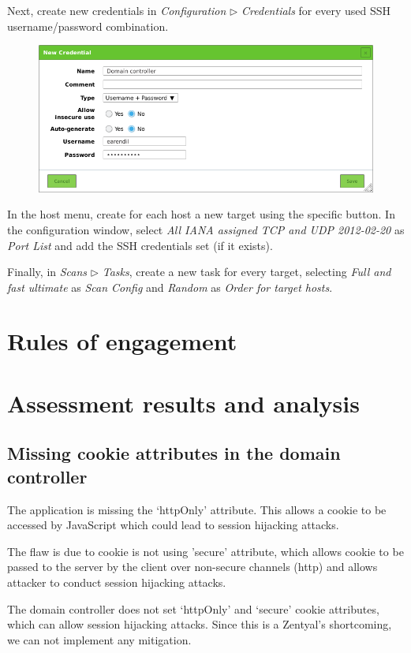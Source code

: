 \documentclass[draft]{homework}
\begin{document}
    Next, create new credentials in \textit{Configuration} $\triangleright$ \textit{Credentials} for every used SSH username/password combination.
    \vspace{-5pt}
    \begin{figure}[H]
        \centering
        \includegraphics[width=1\linewidth]{images/new-credentials}
        \label{fig:new-credentials}
    \end{figure}
    \vspace{-20pt}
    
    In the host menu, create for each host a new target using the specific button.
    In the configuration window, select \textit{All IANA assigned TCP and UDP 2012-02-20} as \textit{Port List} and add the SSH credentials set (if it exists).
    
    Finally, in \textit{Scans} $\triangleright$ \textit{Tasks}, create a new task for every target, selecting \textit{Full and fast ultimate} as \textit{Scan Config} and \textit{Random} as \textit{Order for target hosts}.
    
    
    \section{Rules of engagement}
    
    
    \section{Assessment results and analysis}
    \subsection{Missing cookie attributes in the domain controller}
    \begin{displayquote}
        The application is missing the `httpOnly' attribute.
        \textelp{}
        This allows a cookie to be accessed by JavaScript which could lead to session hijacking attacks.
    \end{displayquote}
    \begin{displayquote}
        The flaw is due to cookie is not using 'secure' attribute, which allows cookie to be passed to the server by the client over non-secure channels (http) and allows attacker to conduct session hijacking attacks.
    \end{displayquote}
    The domain controller does not set `httpOnly' and `secure' cookie attributes, which can allow session hijacking attacks.
    Since this is a Zentyal's shortcoming, we can not implement any mitigation.
    
\end{document}
